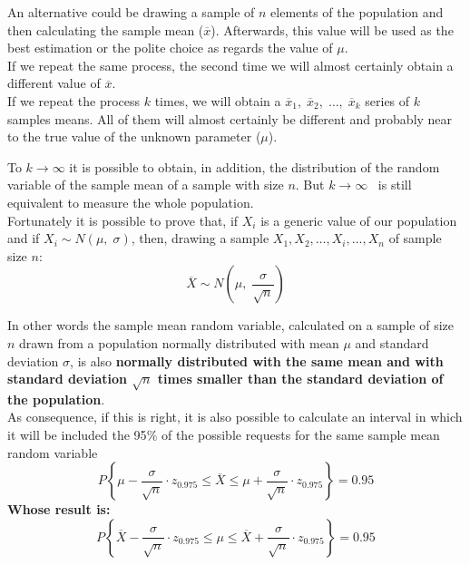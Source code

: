 \begin{frame}
  \vspace*{.25cm}
  An alternative could be drawing a sample of $ n $ elements of the population and then calculating the sample mean ($ \overline{x} $). Afterwards, this value will be used as the best estimation or the polite choice as regards the value of $ \mu $.\\
  \vspace*{.25cm}
   If we repeat the same process, the second time we will almost certainly obtain a different value of $ \overline{x} $. \\
  \vspace*{.25cm}
  If we repeat the process $k$ times, we will obtain a $\overline{x}_1,\;\overline{x}_2,\;\dots,\;\overline{x}_k$ series of $k$ samples means. All of them will almost certainly be different and probably near to the true value of the unknown parameter ($\mu$).\\
\end{frame}    

\begin{frame}
  \vspace*{.5cm}
  To $ k \rightarrow \infty $ it is possible to obtain, in addition, the distribution of the random variable of the sample mean of a sample with size ${n}$. But $ k \rightarrow \infty $ \ is still equivalent to measure the whole population.\\
  \vspace*{.75cm}
  Fortunately it is possible to prove that, if  $ X_i $ is a generic value of our population and if $ X_i \sim N(\mu,\; \sigma) $, then, drawing a sample $ X_1, X_2,\dots, X_i,\dots, X_n $ of sample size $ n $:
  $$ \overline{X} \sim N\left(\mu,\; \frac{\sigma}{\sqrt{n}}\right) $$
\end{frame}

\begin{frame}
  \vspace*{.25cm}
  In other words the sample mean random variable, calculated on a sample of size $ n $ drawn from a population normally distributed with mean $ \mu $ and standard deviation $ \sigma $, is also \textbf{normally distributed with the same mean and with standard deviation {\boldmath $ \sqrt{n} $} times smaller than the standard deviation of the population}. \\  
  As consequence, if this is right, it is also possible to calculate an interval in which it will be included the 95$ \% $ of the possible requests for the same sample mean random variable
  $$ P \left\{ \mu - \frac{\sigma}{\sqrt{n}} \cdot z_{0.975} \leq \overline{X} \leq \mu + \frac{\sigma}{\sqrt{n}} \cdot z_{0.975} \right\} = 0.95 $$
  \textbf{Whose result is:}
  $$ P \left\{ \overline{X} - \frac{\sigma}{\sqrt{n}} \cdot z_{0.975} \leq \mu \leq \overline{X} + \frac{\sigma}{\sqrt{n}} \cdot z_{0.975} \right\} = 0.95 $$
\end{frame}

